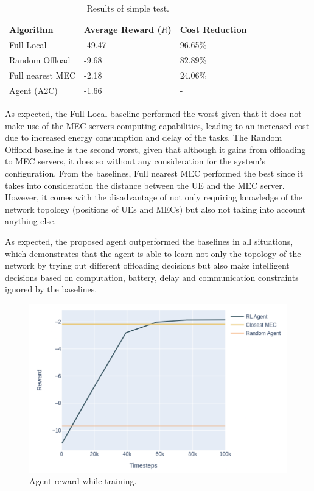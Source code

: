 \documentclass[conference]{IEEEtran}
\begin{document}
\begin{table}[H]
\centering
\begin{tabular}{|l|l|l|}
\hline
Algorithm        & Average Reward ($R$) & Cost Reduction\\ \hline
Full Local       & -49.47 & 96.65\%\\
Random Offload   & -9.68 & 82.89\%\\
Full nearest MEC & -2.18 & 24.06\%\\ 
Agent (A2C) & -1.66 & -\\ \hline
\end{tabular}
\caption{Results of simple test.} \label{resultstest1}
\end{table}

As expected, the Full Local baseline performed the worst given that it does not make use of the \acrshort{MEC} servers computing capabilities, leading to an increased cost due to increased energy consumption and delay of the tasks. The Random Offload baseline is the second worst, given that although it gains from offloading to \acrshort{MEC} servers, it does so without any consideration for the system's configuration. From the baselines, Full nearest MEC performed the best since it takes into consideration the distance between the \acrshort{UE} and the \acrshort{MEC} server. However, it comes with the disadvantage of not only requiring knowledge of the network topology (positions of \acrshort{UE}s and \acrshort{MEC}s) but also not taking into account anything else. 

As expected, the proposed agent outperformed the baselines in all situations, which demonstrates that the agent is able to learn not only the topology of the network by trying out different offloading decisions but also make intelligent decisions based on computation, battery, delay and communication constraints ignored by the baselines.

\begin{figure}[H]
  \centering
  \includegraphics[width=\linewidth]{images/5_5_training.png}
  \caption{Agent reward while training.}  \label{5_5_training}
\end{figure}
\end{document}
